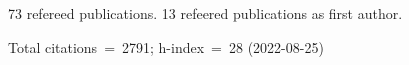 73 refereed publications. 13 refeered publications as first author.

Total citations~=~2791; h-index~=~28 (2022-08-25)